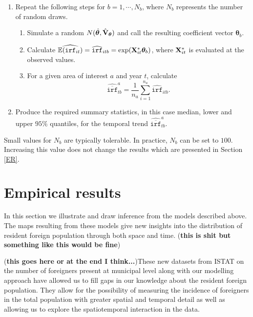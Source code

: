 \documentclass[10pt]{article}
\newcommand{\E}{\mathbb{E}}
\newcommand{\X}{{\bf X}}
\theoremstyle{definition}
\theoremstyle{plain}
\begin{document}
\begin{enumerate}
	\item Repeat the following steps for $b=1,\cdots,N_b$, where $N_b$ represents the number of random draws. 
	   \begin{enumerate}
	      \item Simulate a random $N(\hat{\bm\theta}, \hat{{\bf V}}_{\bm\theta} )$ and call the resulting coefficient vector $\bm\theta_b$.
	      \item Calculate $\widehat{\E(\texttt{irf}_{it})}=\widehat{\texttt{irf}}_{itb}=\exp(\X^*_{it}\bm\theta_b)$, where $\X^*_{it}$ is evaluated at the observed values. 
	      \item For a given area of interest $a$ and year $t$, calculate
	      $$\widehat{\overline{\texttt{irf}}}_{tb}^a=\frac{1}{n_a}\sum_{i=1}^{n_a} \widehat{\texttt{irf}}_{itb}.$$    
	   \end{enumerate}
	\item Produce the required summary statistics, in this case median, lower and upper $95\%$ quantiles, for the temporal trend $\widehat{\overline{\texttt{irf}}}_{tb}^a$.
\end{enumerate}
Small values for $N_b$ are typically tolerable. In practice, $N_b$ can be set to $100$. Increasing this value does not change the results which are presented in Section \ref{ER}.
 

\section{Empirical results \label{ER}}

In this section we illustrate and draw inference from the models described above. The maps resulting from these models give new insights into the distribution of resident foreign population through both space and time. (\textbf{this is shit but something like this would be fine})


(\textbf{this goes here or at the end I think...})These new datasets from ISTAT on the number of foreigners present at municipal level along with our modelling approach have allowed us to fill gaps in our knowledge about the resident foreign population. They allow for the possibility of measuring the incidence of foreigners in the total population with greater spatial and temporal detail as well as allowing us to explore the spatiotemporal interaction in the data.



\end{document}
